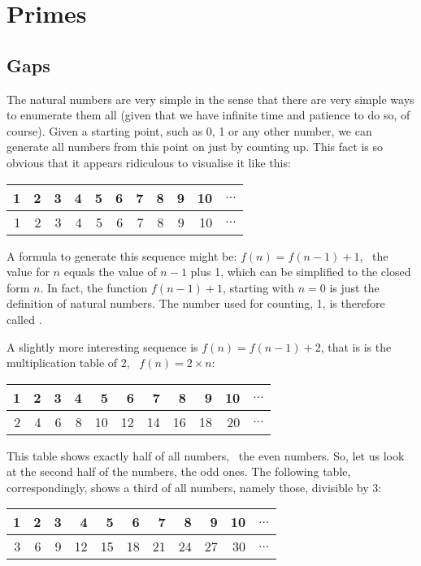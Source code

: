 \documentclass{scrreprt}
\begin{document}
\setlength{\parindent}{0pt}
\setlength{\parskip}{8pt}

\chapter{Primes} %
\section{Gaps}

The natural numbers are very simple in the sense
that there are very simple ways to enumerate them all
(given that we have infinite time and patience to do so, of course).
Given a starting point, such as 0, 1 or any other number,
we can generate all numbers from this point on
just by counting up.
This fact is so obvious that it appears ridiculous
to visualise it like this:

\begin{tabular}{r|r|r|r|r|r|r|r|r|r|c}
1 & 2 & 3 & 4 & 5 & 6 & 7 & 8 & 9 & 10 & $\dots$ \\\hline
1 & 2 & 3 & 4 & 5 & 6 & 7 & 8 & 9 & 10 & $\dots$  
\end{tabular}

A formula to generate this sequence might be:
$f(n) = f(n - 1) + 1$, \ie\ the value for $n$ equals
the value of $n-1$ plus 1, which can be simplified
to the closed form $n$.
In fact, the function $f(n-1) + 1$,
starting with $n=0$ is just the definition
of natural numbers.
The number used for counting, 1, is therefore called .

A slightly more interesting sequence is $f(n) = f(n-1) + 2$,
that is is the multiplication table of 2, \ie\ $f(n) = 2 \times n$:

\begin{tabular}{r|r|r|r|r|r|r|r|r|r|c}
1 & 2 & 3 & 4 & 5  & 6  & 7  & 8  & 9  & 10 & $\dots$ \\\hline
2 & 4 & 6 & 8 & 10 & 12 & 14 & 16 & 18 & 20 & $\dots$
\end{tabular}

This table shows exactly half of all numbers, \viz\
the even numbers.
So, let us look at the second half of the numbers,
the odd ones.
The following table, correspondingly, shows a third of all numbers,
namely those, divisible by 3:

\begin{tabular}{r|r|r|r|r|r|r|r|r|r|c}
1 & 2 & 3 & 4  & 5  & 6  & 7  & 8  & 9  & 10 & $\dots$ \\\hline
3 & 6 & 9 & 12 & 15 & 18 & 21 & 24 & 27 & 30 & $\dots$
\end{tabular}
\end{document}

